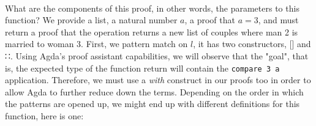 {\begin{code}%
\>[0]\AgdaSpace{}%
\AgdaSymbol{:}%
\>[456I]\AgdaSymbol{(}\AgdaSpace{}%
\AgdaSymbol{:}\AgdaSpace{}%
\AgdaSpace{}%
\AgdaSymbol{(}\AgdaSpace{}%
\AgdaSpace{}%
\AgdaSymbol{))(}\AgdaSpace{}%
\AgdaSymbol{:}\AgdaSpace{}%
\AgdaSymbol{)}\AgdaSpace{}%
\AgdaSpace{}%
\AgdaSpace{}%
\AgdaSpace{}%
\AgdaSpace{}%
\<%
\\
\>[.][@{}l@{}]\<[456I]%
\>[4]\AgdaSpace{}%
\AgdaSymbol{(}\AgdaSpace{}%
\AgdaOperator{\AgdaInductiveConstructor{,}}\AgdaSpace{}%
\AgdaSymbol{)}\AgdaSpace{}%
\AgdaSymbol{((}\AgdaSpace{}%
\AgdaOperator{\AgdaInductiveConstructor{,}}\AgdaSpace{}%
\AgdaSymbol{)}\AgdaSpace{}%
\AgdaSpace{}%
\AgdaSymbol{)}\AgdaSpace{}%
\AgdaSpace{}%
\AgdaSymbol{((}\AgdaSpace{}%
\AgdaOperator{\AgdaInductiveConstructor{,}}\AgdaSpace{}%
\AgdaSymbol{)}\AgdaSpace{}%
\AgdaSpace{}%
\AgdaSymbol{)}\<%
\end{code}

What are the components of this proof, in other words, the parameters to this function? We provide a list, a natural number $a$, a proof that $a = 3$, and must return a proof that the operation returns a new list of couples where man 2 is married to woman 3. First, we pattern match on $l$, it has two constructors, [] and ∷. Using Agda's proof assistant capabilities, we will observe that the "goal", that is, the expected type of the function return will contain the \texttt{compare 3 a} application. Therefore, we must use a \emph{with} construct in our proofs too in order to allow Agda to further reduce down the terms. Depending on the order in which the patterns are opened up, we might end up with different definitions for this function, here is one:

}
